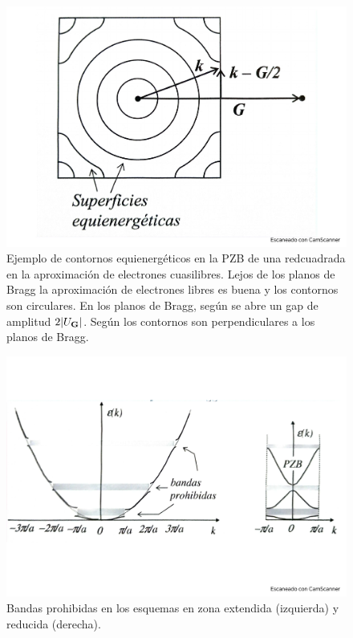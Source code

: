 \begin{figure}[h!] \centering
    \includegraphics[scale=0.5]{Cuerpo/Ch_07/Fotos libro 3.pdf}
    \caption{Ejemplo de contornos equienergéticos en la PZB de una redcuadrada en la aproximación de electrones cuasilibres. Lejos de los planos de Bragg la aproximación de electrones libres es buena y los contornos son circulares. En los planos de Bragg, según se abre un gap de amplitud $2|U_{\mathbf{G}}|$. Según los contornos son perpendiculares a los planos de Bragg.}
    \label{Fig:07-03}
\end{figure}    

\begin{figure}[h!] \centering
    \includegraphics[scale=0.5]{Cuerpo/Ch_07/Fotos libro 4.pdf}
    \caption{Bandas prohibidas en los esquemas en zona extendida (izquierda) y reducida (derecha).}
    \label{Fig:07-04}
\end{figure}    


